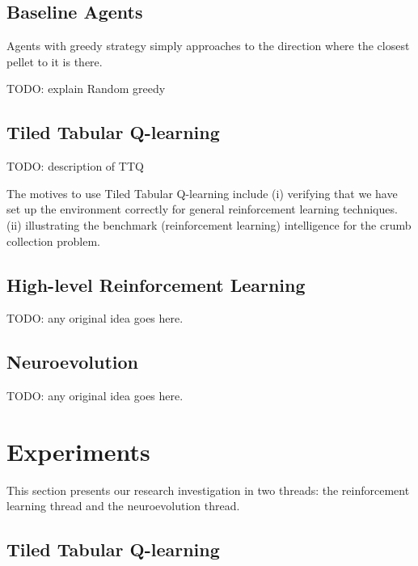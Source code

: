 \documentclass[conference]{IEEEtran}
\begin{document}
\subsection{Baseline Agents} 
Agents with greedy strategy simply approaches to the direction where the
closest pellet to it is there.

TODO: explain Random greedy

\subsection{Tiled Tabular Q-learning} 
TODO: description of TTQ

The motives to use Tiled Tabular Q-learning include
(i) verifying that we have set up the environment correctly for general
reinforcement learning techniques. 
(ii) illustrating the benchmark (reinforcement learning) intelligence for the
crumb collection problem.

\subsection{High-level Reinforcement Learning} 
TODO: any original idea goes here.

\subsection{Neuroevolution} 
TODO: any original idea goes here.


\section{Experiments} \label{section:setup}
This section presents our research investigation in two threads: the
reinforcement learning thread and the neuroevolution thread.



\subsection{Tiled Tabular Q-learning}
\end{document}
